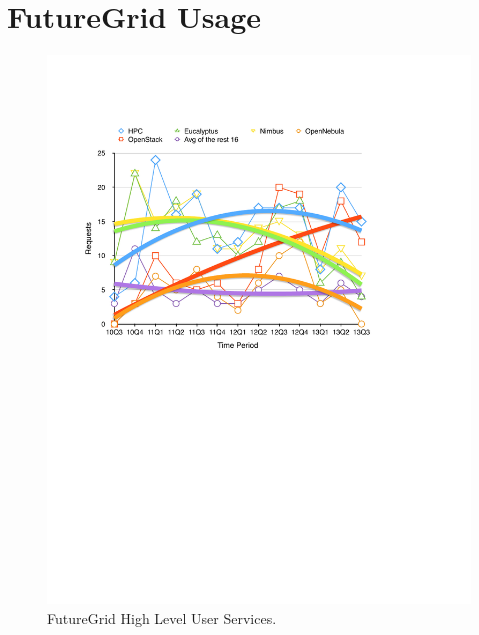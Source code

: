 \section{FutureGrid Usage}

\begin{figure}[htb]
  \centering
    \includegraphics[width=1.0\textwidth]{images/fg-iaas-trend.pdf}
  \caption{FutureGrid High Level User Services.}
\end{figure}

